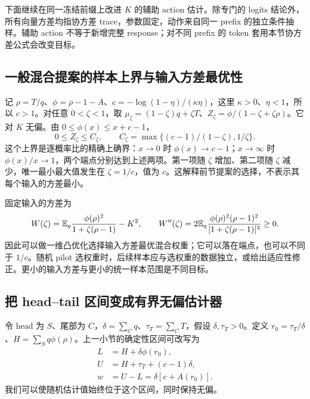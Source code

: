 下面继续在同一冻结前缀上改进 $K$ 的辅助 action 估计。除专门的 logits 结论外，所有向量方差均指协方差 trace，参数固定，动作来自同一 prefix 的独立条件抽样。辅助 action 不等于新增完整 response；对不同 prefix 的 token 套用本节协方差公式会改变目标。

\subsection{一般混合提案的样本上界与输入方差最优性}

记 $\rho=T/q$、$\phi=\rho-1-A$、$c=-\log(1-\eta)/(\kappa\eta)$，这里 $\kappa>0$、$\eta<1$，所以 $c>1$。对任意 $0<\zeta<1$，取 $\mu_\zeta=(1-\zeta)q+\zeta T$、$Z_\zeta=\phi/(1-\zeta+\zeta\rho)$。它对 $K$ 无偏。由 $0\le\phi(x)\le x+c-1$，
\begin{equation}
 0\le Z_\zeta\le C_\zeta,
 \qquad C_\zeta=\max\{(c-1)/(1-\zeta),1/\zeta\}.
\end{equation}
这个上界是逐概率比的精确上确界：$x\to0$ 时 $\phi(x)\to c-1$；$x\to\infty$ 时 $\phi(x)/x\to1$，两个端点分别达到上述两项。第一项随 $\zeta$ 增加、第二项随 $\zeta$ 减少，唯一最小最大值发生在 $\zeta=1/c$，值为 $c$。这解释前节提案的选择，不表示其每个输入的方差最小。

固定输入的方差为
\begin{equation}
 W(\zeta)=\mathbb E_q\frac{\phi(\rho)^2}{1+\zeta(\rho-1)}-K^2,
 \qquad W''(\zeta)=2\mathbb E_q\frac{\phi(\rho)^2(\rho-1)^2}{[1+\zeta(\rho-1)]^3}\ge0.
\end{equation}
因此可以做一维凸优化选择输入方差最优混合权重；它可以落在端点，也可以不同于 $1/c$。随机 pilot 选权重时，后续样本应与选权重的数据独立，或给出适应性修正。更小的输入方差与更小的统一样本范围是不同目标。
\subsection{把 head--tail 区间变成有界无偏估计器}

令 head 为 $S$、尾部为 $C$，$\delta=\sum_Cq$、$\tau_T=\sum_CT$，假设 $\delta,\tau_T>0$。定义 $r_0=\tau_T/\delta$、$H=\sum_Sq\phi(\rho)$。上一小节的确定性区间可改写为
\begin{align}
 L&=H+\delta\phi(r_0),\\
 U&=H+\tau_T+(c-1)\delta,\\
 w&=U-L=\delta[c+A(r_0)].
 \label{eq:center-tail-interval-lu}
\end{align}
我们可以使随机估计值始终位于这个区间，同时保持无偏。


